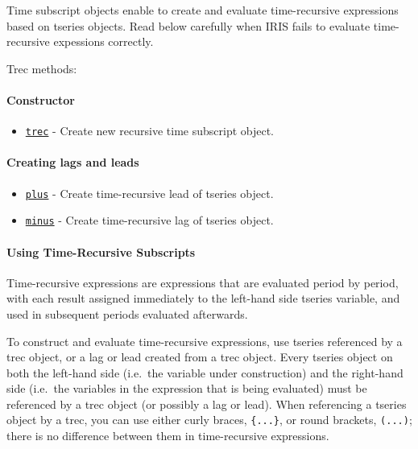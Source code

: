 

	Time subscript objects enable to create and evaluate time-recursive
expressions based on tseries objects. Read below carefully when IRIS
fails to evaluate time-recursive expessions correctly.

Trec methods:

\paragraph{Constructor}\label{constructor}

\begin{itemize}
\itemsep1pt\parskip0pt
\item
  \href{trec/trec}{\texttt{trec}} - Create new recursive time subscript
  object.
\end{itemize}

\paragraph{Creating lags and leads}\label{creating-lags-and-leads}

\begin{itemize}
\itemsep1pt\parskip0pt
\item
  \href{trec/plus}{\texttt{plus}} - Create time-recursive lead of
  tseries object.
\item
  \href{trec/minus}{\texttt{minus}} - Create time-recursive lag of
  tseries object.
\end{itemize}

\paragraph{Using Time-Recursive
Subscripts}\label{using-time-recursive-subscripts}

Time-recursive expressions are expressions that are evaluated period by
period, with each result assigned immediately to the left-hand side
tseries variable, and used in subsequent periods evaluated afterwards.

To construct and evaluate time-recursive expressions, use tseries
referenced by a trec object, or a lag or lead created from a trec
object. Every tseries object on both the left-hand side (i.e.~the
variable under construction) and the right-hand side (i.e.~the variables
in the expression that is being evaluated) must be referenced by a trec
object (or possibly a lag or lead). When referencing a tseries object by
a trec, you can use either curly braces, \texttt{\{...\}}, or round
brackets, \texttt{(...)}; there is no difference between them in
time-recursive expressions.

